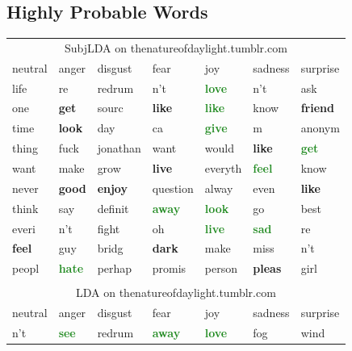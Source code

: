 \documentclass{article}
\begin{document}
\subsection{Highly Probable Words}
\begin{table}
\centering
\begin{tabular}{ l l l l l l l  }
\multicolumn{7}{c}{ \sc SubjLDA on thenatureofdaylight.tumblr.com }\\
\sc neutral & \sc anger & \sc disgust & \sc fear & \sc joy & \sc sadness & \sc surprise \\
\hline
life & re & redrum & n't & \textcolor{ForestGreen}{\textbf{love}} & n't & ask \\
one & \textcolor{BrickRed}{\textbf{get}} & sourc & \textcolor{BrickRed}{\textbf{like}} & \textcolor{ForestGreen}{\textbf{like}} & know & \textcolor{BrickRed}{\textbf{friend}} \\
time & \textcolor{BrickRed}{\textbf{look}} & day & ca & \textcolor{ForestGreen}{\textbf{give}} & m & anonym \\
thing & fuck & jonathan & want & would & \textcolor{BrickRed}{\textbf{like}} & \textcolor{ForestGreen}{\textbf{get}} \\
want & make & grow & \textcolor{BrickRed}{\textbf{live}} & everyth & \textcolor{ForestGreen}{\textbf{feel}} & know \\
never & \textcolor{BrickRed}{\textbf{good}} & \textcolor{BrickRed}{\textbf{enjoy}} & question & alway & even & \textcolor{BrickRed}{\textbf{like}} \\
think & say & definit & \textcolor{ForestGreen}{\textbf{away}} & \textcolor{ForestGreen}{\textbf{look}} & go & best \\
everi & n't & fight & oh & \textcolor{ForestGreen}{\textbf{live}} & \textcolor{ForestGreen}{\textbf{sad}} & re \\
\textcolor{BrickRed}{\textbf{feel}} & guy & bridg & \textcolor{BrickRed}{\textbf{dark}} & make & miss & n't \\
     peopl & \textcolor{ForestGreen}{\textbf{hate}} & perhap & promis & person & \textcolor{BrickRed}{\textbf{pleas}} & girl \\
\multicolumn{7}{c}{ } \\
\multicolumn{7}{c}{ \sc LDA on thenatureofdaylight.tumblr.com }\\
\sc neutral & \sc anger & \sc disgust & \sc fear & \sc joy & \sc sadness & \sc surprise \\
\hline
n't & \textcolor{ForestGreen}{\textbf{see}} & redrum & \textcolor{ForestGreen}{\textbf{away}} & \textcolor{ForestGreen}{\textbf{love}} & fog & wind \\

\end{tabular}
\end{table}
\end{document}
